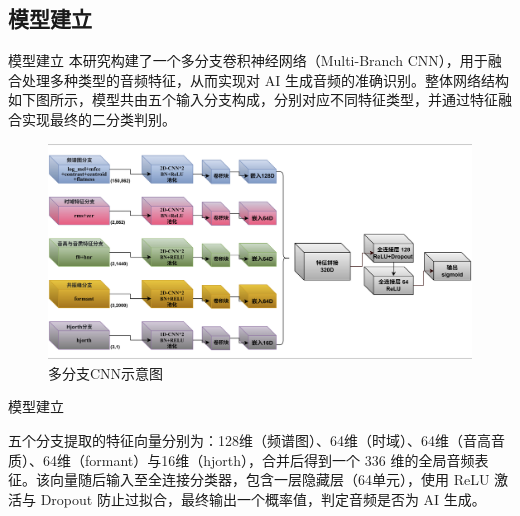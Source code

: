 \documentclass[aspectratio=169]{beamer}
\begin{document}
\subsection{模型建立}
\begin{frame}{模型建立}
本研究构建了一个多分支卷积神经网络（Multi-Branch CNN），用于融合处理多种类型的音频特征，从而实现对 AI 生成音频的准确识别。整体网络结构如下图所示，模型共由五个输入分支构成，分别对应不同特征类型，并通过特征融合实现最终的二分类判别。

\begin{figure}[h]
    \centering
    \includegraphics[width=0.75\linewidth]{images_in_paper/model.png}
    \caption{多分支CNN示意图}
    \label{fig:model}
\end{figure}

\end{frame}

\begin{frame}{模型建立}

\begin{table}[h]
  \centering
  \small
  \caption{多分支特征处理结构概览}
  \label{tab:branch-structure}
\end{table}

五个分支提取的特征向量分别为：128维（频谱图）、64维（时域）、64维（音高音质）、64维（formant）与16维（hjorth），合并后得到一个 $336$ 维的全局音频表征。该向量随后输入至全连接分类器，包含一层隐藏层（64单元），使用 ReLU 激活与 Dropout 防止过拟合，最终输出一个概率值，判定音频是否为 AI 生成。
\end{frame}
\end{document}
